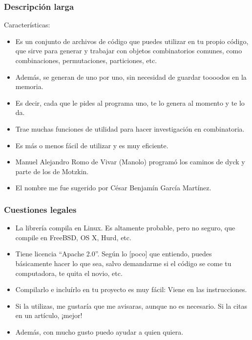 \documentclass[spanish,professionalfonts]{beamer}
\begin{document}
\begin{frame}\frametitle{Descripción larga}
 Características:
 \begin{itemize}
  \item Es un conjunto de archivos de código que puedes utilizar en tu propio código, que sirve para generar y trabajar con objetos combinatorios comunes, como combinaciones, permutaciones, particiones, etc.  \pause
  \item Además, se generan de uno por uno, sin necesidad de guardar toooodos en la memoria. \pause
  \item Es decir, cada que le pides al programa uno, te lo genera al momento y te lo da.  \pause
  \item Trae muchas funciones de utilidad para hacer investigación en combinatoria.  \pause
  \item Es más o menos fácil de utilizar y es muy eficiente. \pause
  \item Manuel Alejandro Romo de Vivar (Manolo) programó los caminos de dyck y parte de los de Motzkin. \pause
  \item El nombre me fue sugerido por César Benjamín García Martínez.
 \end{itemize}
\end{frame}

\begin{frame}\frametitle{Cuestiones legales}
  \begin{itemize}
    \item La librería compila en Linux. Es altamente probable, pero no seguro, que compile en FreeBSD, OS X, Hurd, etc. \pause
    \item Tiene licencia ``Apache 2.0''. Según lo [poco] que entiendo, puedes básicamente hacer lo que sea, salvo demandarme si el código se come tu computadora, te quita el novio, etc. \pause
    \item Compilarlo e incluírlo en tu proyecto es muy fácil: Viene en las instrucciones. \pause
    \item Si la utilizas, me gustaría que me avisaras, aunque no es necesario. Si la citas en un artículo, ¡mejor! \pause
    \item Además, con mucho gusto puedo ayudar a quien quiera.
  \end{itemize}
\end{frame}

\end{document}

